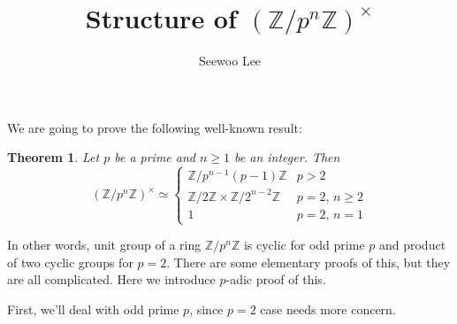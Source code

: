 \documentclass{article}
\title{Structure of $(\mathbb{Z}/p^{n}\mathbb{Z})^{\times}$}
\author{Seewoo Lee}
\newtheorem{theorem}{Theorem}
\begin{document}
\maketitle

We are going to prove the following well-known result:
\begin{theorem}
Let $p$ be a prime and $n\geq 1$ be an integer. Then 
$$
(\mathbb{Z}/p^{n}\mathbb{Z})^{\times} \simeq \begin{cases} \mathbb{Z}/p^{n-1}(p-1)\mathbb{Z} & p>2 \\ \mathbb{Z}/2\mathbb{Z}\times \mathbb{Z}/2^{n-2}\mathbb{Z} & p=2, \, n\geq 2 \\
1 & p=2, \, n=1\end{cases}
$$
\end{theorem}

In other words, unit group of a ring $\mathbb{Z}/p^{n}\mathbb{Z}$ is cyclic for odd prime $p$ and product of two cyclic groups for $p=2$. 
There are some elementary proofs of this, but they are all complicated. Here we introduce $p$-adic proof of this. 

First, we'll deal with odd prime $p$, since $p=2$ case needs more concern. 
\end{document}
